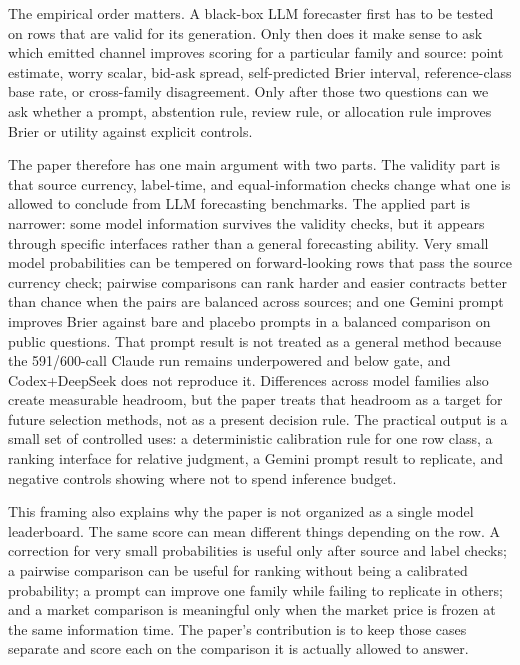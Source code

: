 \documentclass[11pt]{article}
\begin{document}
The empirical order matters. A black-box LLM forecaster first has to be tested on rows that are valid for its generation. Only then does it make sense to ask which emitted channel improves scoring for a particular family and source: point estimate, worry scalar, bid-ask spread, self-predicted Brier interval, reference-class base rate, or cross-family disagreement. Only after those two questions can we ask whether a prompt, abstention rule, review rule, or allocation rule improves Brier or utility against explicit controls.

The paper therefore has one main argument with two parts. The validity part is that source currency, label-time, and equal-information checks change what one is allowed to conclude from LLM forecasting benchmarks. The applied part is narrower: some model information survives the validity checks, but it appears through specific interfaces rather than a general forecasting ability. Very small model probabilities can be tempered on forward-looking rows that pass the source currency check; pairwise comparisons can rank harder and easier contracts better than chance when the pairs are balanced across sources; and one Gemini prompt improves Brier against bare and placebo prompts in a balanced comparison on public questions. That prompt result is not treated as a general method because the 591/600-call Claude run remains underpowered and below gate, and Codex+DeepSeek does not reproduce it. Differences across model families also create measurable headroom, but the paper treats that headroom as a target for future selection methods, not as a present decision rule. The practical output is a small set of controlled uses: a deterministic calibration rule for one row class, a ranking interface for relative judgment, a Gemini prompt result to replicate, and negative controls showing where not to spend inference budget.

This framing also explains why the paper is not organized as a single model leaderboard. The same score can mean different things depending on the row. A correction for very small probabilities is useful only after source and label checks; a pairwise comparison can be useful for ranking without being a calibrated probability; a prompt can improve one family while failing to replicate in others; and a market comparison is meaningful only when the market price is frozen at the same information time. The paper's contribution is to keep those cases separate and score each on the comparison it is actually allowed to answer.
\end{document}
